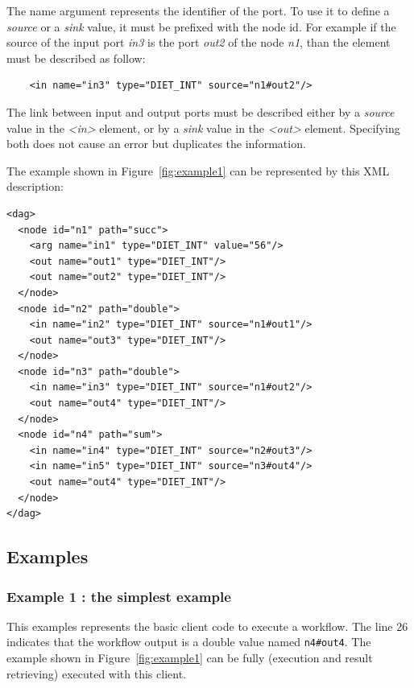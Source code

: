The name argument represents the identifier of the port. To use it to
define a \textit{source} or a \textit{sink} value, it must be prefixed
with the node id. For example if the source of the input port
\textit{in3} is the port \textit{out2} of the node \textit{n1}, than
the element must be described as follow:

\begin{verbatim}
    <in name="in3" type="DIET_INT" source="n1#out2"/>
\end{verbatim}

The link between input and output ports must be described either by
a \textit{source} value in the \textit{<in>} element, or by a
\textit{sink} value in the \textit{<out>} element. Specifying both
does not cause an error but duplicates the information.

The example shown in Figure~\ref{fig:example1} can be represented by
this XML description:

\begin{verbatim}
<dag>
  <node id="n1" path="succ">
    <arg name="in1" type="DIET_INT" value="56"/>
    <out name="out1" type="DIET_INT"/>
    <out name="out2" type="DIET_INT"/>
  </node>
  <node id="n2" path="double">
    <in name="in2" type="DIET_INT" source="n1#out1"/>
    <out name="out3" type="DIET_INT"/>
  </node>
  <node id="n3" path="double">
    <in name="in3" type="DIET_INT" source="n1#out2"/>
    <out name="out4" type="DIET_INT"/>
  </node>
  <node id="n4" path="sum">
    <in name="in4" type="DIET_INT" source="n2#out3"/>
    <in name="in5" type="DIET_INT" source="n3#out4"/>
    <out name="out4" type="DIET_INT"/>
  </node>
</dag>
\end{verbatim}

\subsection{Examples}
\label{sec:examples}


\subsubsection{Example 1 : the simplest example}
\label{sec:ex1}

This examples represents the basic client code to execute a workflow.
The line 26 indicates that the workflow output is a double value named
\verb|n4#out4|. The example shown in Figure~\ref{fig:example1} can be
fully (execution and result retrieving) executed with this client.

